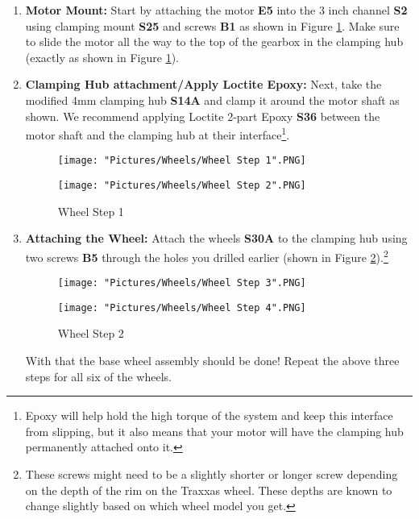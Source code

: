 \documentclass[12pt]{article}
\begin{document}
\begin{enumerate}
\item \textbf{Motor Mount:} Start by attaching the motor \textbf{E5} into the 3 inch channel \textbf{S2} using clamping mount \textbf{S25} and screws \textbf{B1} as shown in Figure \ref{wheel step 1}. Make sure to slide the motor all the way  to the top of the gearbox in the clamping hub (exactly as shown in Figure \ref{wheel step 1}).


\item \textbf{Clamping Hub attachment/Apply Loctite Epoxy:} Next, take the modified 4mm clamping hub \textbf{S14A} and clamp it around the motor shaft as shown. We recommend applying Loctite 2-part Epoxy \textbf{S36} between the motor shaft and the clamping hub at their interface\footnote{Epoxy will help hold the high torque of the system and keep this interface from slipping, but it also means that your motor will have the clamping hub permanently attached onto it.}.

\begin{figure}[H]
  \centering
  \begin{minipage}[b]{0.45\textwidth}
    \texttt{[image: "Pictures/Wheels/Wheel Step 1".PNG]}
  \end{minipage}
  \hfill
  \begin{minipage}[b]{0.45\textwidth}
    \texttt{[image: "Pictures/Wheels/Wheel Step 2".PNG]}
  \end{minipage}
  \caption{Wheel Step 1}
  \label{wheel step 1}
\end{figure}
\item \textbf{Attaching the Wheel:} Attach the wheels \textbf{S30A} to the clamping hub using two screws \textbf{B5} through the holes you drilled earlier (shown in Figure \ref{wheel step 2}).\footnote{These screws might need to be a slightly shorter or longer screw depending on the depth of the rim on the Traxxas wheel.  These depths are known to change slightly based on which wheel model you get.}

\begin{figure}[H]
  \centering
  \begin{minipage}[b]{0.45\textwidth}
    \texttt{[image: "Pictures/Wheels/Wheel Step 3".PNG]}
  \end{minipage}
  \hfill
  \begin{minipage}[b]{0.45\textwidth}
    \texttt{[image: "Pictures/Wheels/Wheel Step 4".PNG]}
  \end{minipage}
  \caption{Wheel Step 2}
  \label{wheel step 2}
\end{figure}

With that the base wheel assembly should be done! Repeat the above three steps for all six of the wheels.

\end{enumerate}
\end{document}
